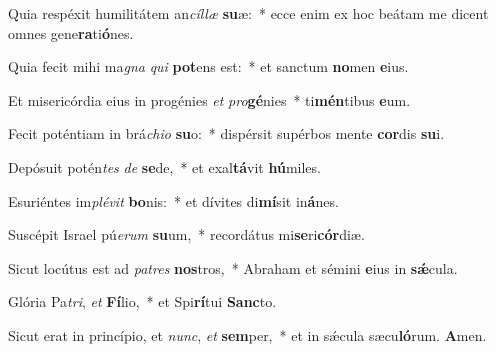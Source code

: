 \item Quia respéxit humilitátem an\textit{cíllæ} \textbf{su}æ:~* ecce enim ex hoc beátam me dicent omnes gene\textbf{ra}ti\textbf{ó}nes.

\item Quia fecit mihi ma\textit{gna} \textit{qui} \textbf{pot}ens est:~* et sanctum \textbf{no}men \textbf{e}ius.

\item Et misericórdia eius in progénies \textit{et} \textit{pro}\textbf{gé}nies~* ti\textbf{mén}tibus \textbf{e}um.

\item Fecit poténtiam in brá\textit{chio} \textbf{su}o:~* dispérsit supérbos mente \textbf{cor}dis \textbf{su}i.

\item Depósuit potén\textit{tes} \textit{de} \textbf{se}de,~* et exal\textbf{tá}vit \textbf{hú}miles.

\item Esuriéntes im\textit{plévit} \textbf{bo}nis:~* et dívites di\textbf{mí}sit in\textbf{á}nes.

\item Suscépit Israel pú\textit{erum} \textbf{su}um,~* recordátus mi\textbf{se}ri\textbf{cór}diæ.

\item Sicut locútus est ad \textit{patres} \textbf{nos}tros,~* Abraham et sémini \textbf{e}ius in \textbf{sǽ}cula.

\item Glória Pa\textit{tri}, \textit{et} \textbf{Fí}lio,~* et Spi\textbf{rí}tui \textbf{Sanc}to.

\item Sicut erat in princípio, et \textit{nunc}, \textit{et} \textbf{sem}per,~* et in sǽcula sæcu\textbf{ló}rum. \textbf{A}men.